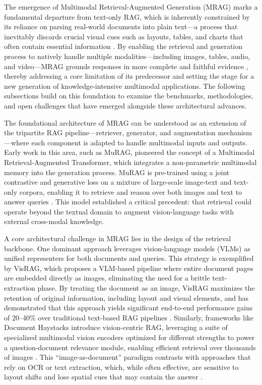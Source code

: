 \documentclass[11pt]{article}
\begin{document}
The emergence of Multimodal Retrieval-Augmented Generation (MRAG) marks a fundamental departure from text-only RAG, which is inherently constrained by its reliance on parsing real-world documents into plain text---a process that inevitably discards crucial visual cues such as layouts, tables, and charts that often contain essential information \cite{ref342}. By enabling the retrieval and generation process to natively handle multiple modalities---including images, tables, audio, and video---MRAG grounds responses in more complete and faithful evidence \cite{ref343,ref45}, thereby addressing a core limitation of its predecessor and setting the stage for a new generation of knowledge-intensive multimodal applications. The following subsections build on this foundation to examine the benchmarks, methodologies, and open challenges that have emerged alongside these architectural advances.

The foundational architecture of MRAG can be understood as an extension of the tripartite RAG pipeline---retriever, generator, and augmentation mechanism---where each component is adapted to handle multimodal inputs and outputs. Early work in this area, such as MuRAG, pioneered the concept of a Multimodal Retrieval-Augmented Transformer, which integrates a non-parametric multimodal memory into the generation process. MuRAG is pre-trained using a joint contrastive and generative loss on a mixture of large-scale image-text and text-only corpora, enabling it to retrieve and reason over both images and text to answer queries \cite{ref344}. This model established a critical precedent: that retrieval could operate beyond the textual domain to augment vision-language tasks with external cross-modal knowledge.

A core architectural challenge in MRAG lies in the design of the retrieval backbone. One dominant approach leverages vision-language models (VLMs) as unified representers for both documents and queries. This strategy is exemplified by VisRAG, which proposes a VLM-based pipeline where entire document pages are embedded directly as images, eliminating the need for a brittle text-extraction phase. By treating the document as an image, VisRAG maximizes the retention of original information, including layout and visual elements, and has demonstrated that this approach yields significant end-to-end performance gains of 20--40\% over traditional text-based RAG pipelines \cite{ref342}. Similarly, frameworks like Document Haystacks introduce vision-centric RAG, leveraging a suite of specialized multimodal vision encoders optimized for different strengths to power a question-document relevance module, enabling efficient retrieval over thousands of images \cite{ref345}. This ``image-as-document'' paradigm contrasts with approaches that rely on OCR or text extraction, which, while often effective, are sensitive to layout shifts and lose spatial cues that may contain the answer \cite{ref346}.
\end{document}
